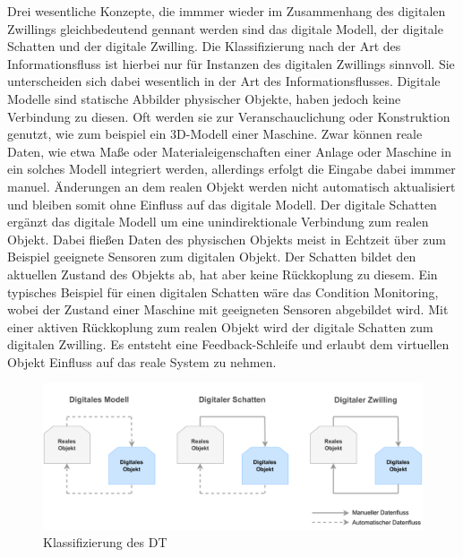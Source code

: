 Drei wesentliche Konzepte, die immmer wieder im Zusammenhang des digitalen Zwillings gleichbedeutend gennant werden sind das digitale Modell, der digitale Schatten und der digitale Zwilling. \cite{KRITZINGER20181016}
Die Klassifizierung nach der Art des Informationsfluss ist hierbei nur für Instanzen des digitalen Zwillings sinnvoll.
Sie unterscheiden sich dabei wesentlich in der Art des Informationsflusses.
Digitale Modelle sind statische Abbilder physischer Objekte, haben jedoch keine Verbindung zu diesen. 
Oft werden sie zur Veranschauclichung oder Konstruktion genutzt, wie zum beispiel ein 3D-Modell einer Maschine.
Zwar können reale Daten, wie etwa Maße oder Materialeigenschaften einer Anlage oder Maschine in ein solches Modell integriert werden, allerdings erfolgt die Eingabe dabei immmer manuel.
Änderungen an dem realen Objekt werden nicht automatisch aktualisiert und bleiben somit ohne Einfluss auf das digitale Modell.
Der digitale Schatten ergänzt das digitale Modell um eine unindirektionale Verbindung zum realen Objekt.
Dabei fließen Daten des physischen Objekts meist in Echtzeit über zum Beispiel geeignete Sensoren zum digitalen Objekt.
Der Schatten bildet den aktuellen Zustand des Objekts ab, hat aber keine Rückkoplung zu diesem.
Ein typisches Beispiel für einen digitalen Schatten wäre das Condition Monitoring, wobei der Zustand einer Maschine mit geeigneten Sensoren abgebildet wird.
Mit einer aktiven Rückkoplung zum realen Objekt wird der digitale Schatten zum digitalen Zwilling.
Es entsteht eine Feedback-Schleife und erlaubt dem virtuellen Objekt Einfluss auf das reale System zu nehmen.


\begin{figure}[htbp]
    \centering
    \includegraphics[width=1\textwidth]{Bilder/klassifizierung_DT.pdf}
    \caption{Klassifizierung des DT}
    \label{fig:klassifizierungDT}
\end{figure}

